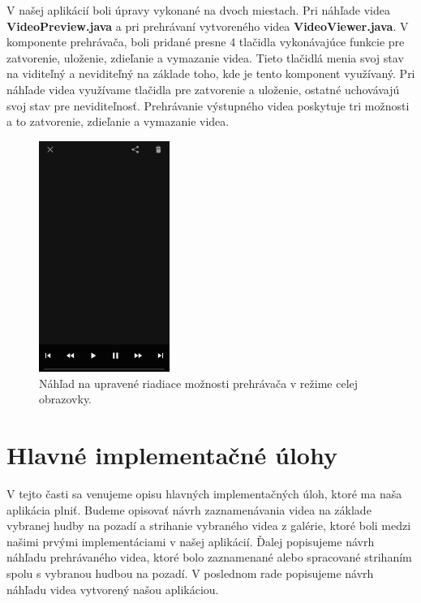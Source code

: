\documentclass[12pt, oneside]{book}
\begin{document}
\hspace{15pt} V našej aplikácií boli úpravy vykonané na dvoch miestach. Pri náhľade videa \textbf{VideoPreview.java} a pri prehrávaní vytvoreného videa \textbf{VideoViewer.java}. V komponente prehrávača, boli pridané presne 4 tlačidla vykonávajúce funkcie pre zatvorenie, uloženie, zdieľanie a vymazanie videa. Tieto tlačidlá menia svoj stav na viditeľný a neviditeľný na základe toho, kde je tento komponent využívaný. Pri náhľade videa využívame tlačidla pre zatvorenie a uloženie, ostatné uchovávajú svoj stav pre neviditeľnosť. Prehrávanie výstupného videa poskytuje tri možnosti a to zatvorenie, zdieľanie a vymazanie videa.

\begin{figure}[H]
    \centering
    \includegraphics[width=0.38\textwidth]{images/exo.png}
    \caption{Náhľad na upravené riadiace možnosti prehrávača v režime celej obrazovky. }
    \label{fig:obr09}
\end{figure}


\section{Hlavné implementačné úlohy}

\hspace{15pt} V tejto časti sa venujeme opisu hlavných implementačných úloh, ktoré ma naša aplikácia plniť. Budeme opisovať návrh zaznamenávania videa na základe vybranej hudby na pozadí a strihanie vybraného videa z galérie, ktoré boli medzi našimi prvými implementáciami v našej aplikácií. Ďalej popisujeme návrh náhľadu prehrávaného videa, ktoré bolo zaznamenané alebo spracované strihaním spolu s vybranou hudbou na pozadí. V poslednom rade popisujeme návrh náhľadu videa vytvorený našou aplikáciou.
\end{document}
